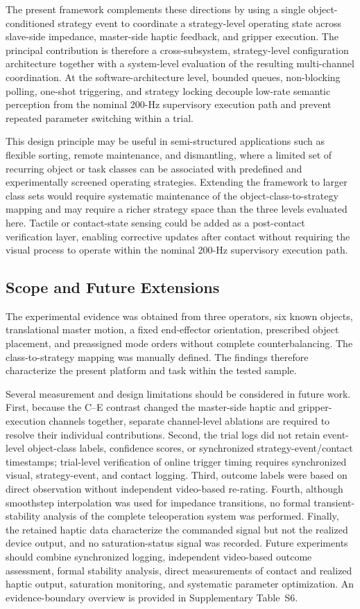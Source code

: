 The present framework complements these directions by using a single object-conditioned strategy event to coordinate a strategy-level operating state across slave-side impedance, master-side haptic feedback, and gripper execution. The principal contribution is therefore a cross-subsystem, strategy-level configuration architecture together with a system-level evaluation of the resulting multi-channel coordination. At the software-architecture level, bounded queues, non-blocking polling, one-shot triggering, and strategy locking decouple low-rate semantic perception from the nominal 200-Hz supervisory execution path and prevent repeated parameter switching within a trial.

This design principle may be useful in semi-structured applications such as flexible sorting, remote maintenance, and dismantling, where a limited set of recurring object or task classes can be associated with predefined and experimentally screened operating strategies. Extending the framework to larger class sets would require systematic maintenance of the object-class-to-strategy mapping and may require a richer strategy space than the three levels evaluated here. Tactile or contact-state sensing could be added as a post-contact verification layer, enabling corrective updates after contact without requiring the visual process to operate within the nominal 200-Hz supervisory execution path.
\subsection{Scope and Future Extensions}
The experimental evidence was obtained from three operators, six known objects, translational master motion, a fixed end-effector orientation, prescribed object placement, and preassigned mode orders without complete counterbalancing. The class-to-strategy mapping was manually defined. The findings therefore characterize the present platform and task within the tested sample.

Several measurement and design limitations should be considered in future work. First, because the C--E contrast changed the master-side haptic and gripper-execution channels together, separate channel-level ablations are required to resolve their individual contributions. Second, the trial logs did not retain event-level object-class labels, confidence scores, or synchronized strategy-event/contact timestamps; trial-level verification of online trigger timing requires synchronized visual, strategy-event, and contact logging. Third, outcome labels were based on direct observation without independent video-based re-rating. Fourth, although smoothstep interpolation was used for impedance transitions, no formal transient-stability analysis of the complete teleoperation system was performed. Finally, the retained haptic data characterize the commanded signal but not the realized device output, and no saturation-status signal was recorded. Future experiments should combine synchronized logging, independent video-based outcome assessment, formal stability analysis, direct measurements of contact and realized haptic output, saturation monitoring, and systematic parameter optimization. An evidence-boundary overview is provided in Supplementary Table~S6.
